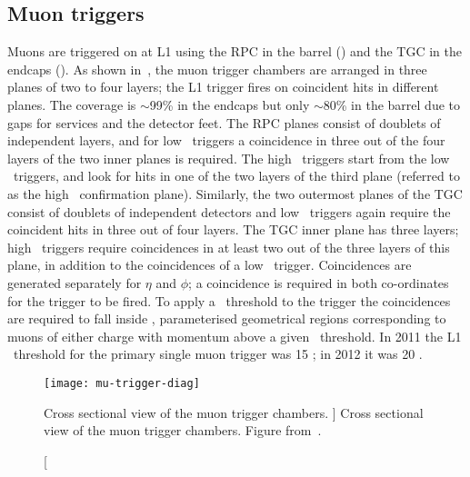\subsection{Muon triggers}
\label{sec:reco-mu-triggers}

Muons are triggered on at L1 using the RPC in the barrel () and
the TGC in the endcaps (). As shown in~, the
muon trigger chambers are arranged in three planes of two to four layers; the L1
trigger fires on coincident hits in different planes. The coverage is $\sim$99\% in the
endcaps but only $\sim$80\% in the barrel due to gaps for services and the
detector feet.  The RPC planes consist of doublets of independent layers, and
for low \pt\ triggers a coincidence in three out of the four layers of the two inner planes
is required. The high \pt\ triggers start from the low \pt\ triggers, and look
for hits in one of the two layers of the third plane (referred to as the high
\pt\ confirmation plane). Similarly, the two outermost planes of the TGC consist
of doublets of independent detectors and low \pt\ triggers again require the
coincident hits in three out of four layers. The TGC inner plane has three
layers; high \pt\ triggers require coincidences in at least two out of the three layers
of this plane, in addition to the coincidences of a low \pt\ trigger. Coincidences are generated
separately for $\eta$ and $\phi$; a coincidence is required in both co-ordinates
for the trigger to be fired. To apply a \pt\ threshold to the trigger the
coincidences are required to fall inside , parameterised
geometrical regions corresponding to muons of either charge with momentum above
a given \pt\ threshold. In 2011 the L1 \pt\ threshold for the primary single
muon trigger was 15 \GeV; in 2012 it was 20 \GeV.

\begin{figure}[h]
\centering
            \texttt{[image: mu-trigger-diag]}
\caption[Cross sectional view of the muon trigger chambers. ][Cross sectional view of the muon trigger chambers. ]{
Cross sectional view of the muon trigger chambers. Figure from~\cite{Aad:2012xs}.}
\label{fig:mu-trigger-diag}
\end{figure}

